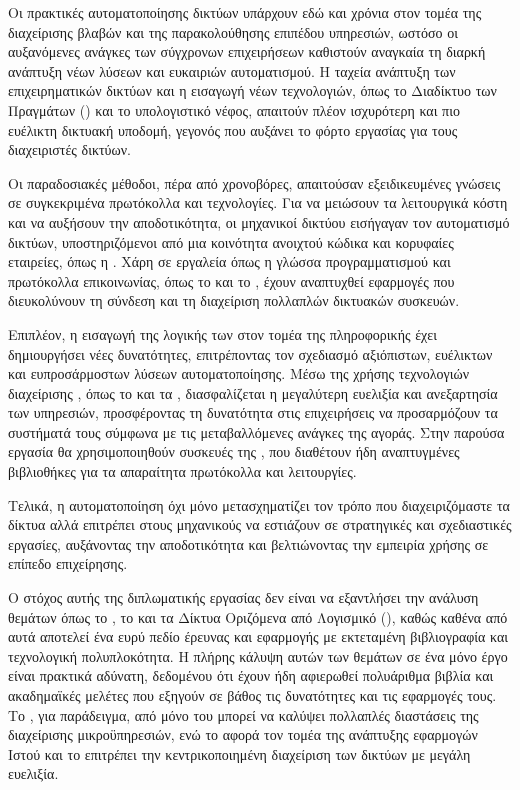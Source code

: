 Οι πρακτικές αυτοματοποίησης δικτύων υπάρχουν εδώ και χρόνια στον τομέα της διαχείρισης βλαβών και της παρακολούθησης επιπέδου υπηρεσιών, ωστόσο 
οι αυξανόμενες ανάγκες των σύγχρονων επιχειρήσεων καθιστούν αναγκαία τη διαρκή ανάπτυξη νέων λύσεων και ευκαιριών αυτοματισμού. Η ταχεία ανάπτυξη των 
επιχειρηματικών δικτύων και η εισαγωγή νέων τεχνολογιών, όπως το Διαδίκτυο των Πραγμάτων () και το υπολογιστικό νέφος, απαιτούν πλέον ισχυρότερη και 
πιο ευέλικτη δικτυακή υποδομή, γεγονός που αυξάνει το φόρτο εργασίας για τους διαχειριστές δικτύων.

Οι παραδοσιακές μέθοδοι, πέρα από χρονοβόρες, απαιτούσαν εξειδικευμένες γνώσεις σε συγκεκριμένα πρωτόκολλα και τεχνολογίες. Για να μειώσουν τα 
λειτουργικά κόστη και να αυξήσουν την αποδοτικότητα, οι μηχανικοί δικτύου εισήγαγαν τον αυτοματισμό δικτύων, υποστηριζόμενοι από μια κοινότητα 
ανοιχτού κώδικα και κορυφαίες εταιρείες, όπως η . Χάρη σε εργαλεία όπως η γλώσσα προγραμματισμού  και πρωτόκολλα επικοινωνίας, όπως το 
 και το , έχουν αναπτυχθεί εφαρμογές που διευκολύνουν τη σύνδεση και τη διαχείριση πολλαπλών δικτυακών συσκευών.

Επιπλέον, η εισαγωγή της λογικής των  στον τομέα της πληροφορικής έχει δημιουργήσει νέες δυνατότητες, επιτρέποντας τον 
σχεδιασμό αξιόπιστων, ευέλικτων και ευπροσάρμοστων λύσεων αυτοματοποίησης. Μέσω της χρήσης τεχνολογιών διαχείρισης , όπως το  
και τα , διασφαλίζεται η μεγαλύτερη ευελιξία και ανεξαρτησία των υπηρεσιών, προσφέροντας τη δυνατότητα στις επιχειρήσεις να προσαρμόζουν τα 
συστήματά τους σύμφωνα με τις μεταβαλλόμενες ανάγκες της αγοράς. Στην παρούσα εργασία θα χρησιμοποιηθούν συσκευές της , που διαθέτουν ήδη 
αναπτυγμένες βιβλιοθήκες για τα απαραίτητα πρωτόκολλα και λειτουργίες.

Τελικά, η αυτοματοποίηση όχι μόνο μετασχηματίζει τον τρόπο που διαχειριζόμαστε τα δίκτυα αλλά επιτρέπει στους μηχανικούς να εστιάζουν σε στρατηγικές και 
σχεδιαστικές εργασίες, αυξάνοντας την αποδοτικότητα και βελτιώνοντας την εμπειρία χρήσης σε επίπεδο επιχείρησης.

Ο στόχος αυτής της διπλωματικής εργασίας δεν είναι να εξαντλήσει την ανάλυση θεμάτων όπως το , το 
και τα Δίκτυα Οριζόμενα από Λογισμικό (), καθώς καθένα από αυτά αποτελεί ένα ευρύ πεδίο έρευνας και εφαρμογής με εκτεταμένη βιβλιογραφία και 
τεχνολογική πολυπλοκότητα. Η πλήρης κάλυψη αυτών των θεμάτων σε ένα μόνο έργο είναι πρακτικά αδύνατη, δεδομένου ότι έχουν ήδη αφιερωθεί 
πολυάριθμα βιβλία και ακαδημαϊκές μελέτες που εξηγούν σε βάθος τις δυνατότητες και τις εφαρμογές τους. Το , 
για παράδειγμα, από μόνο του μπορεί να καλύψει πολλαπλές διαστάσεις της διαχείρισης μικροϋπηρεσιών, ενώ το  
αφορά τον τομέα της ανάπτυξης εφαρμογών Ιστού και το  επιτρέπει την κεντρικοποιημένη διαχείριση των δικτύων με μεγάλη ευελιξία.

